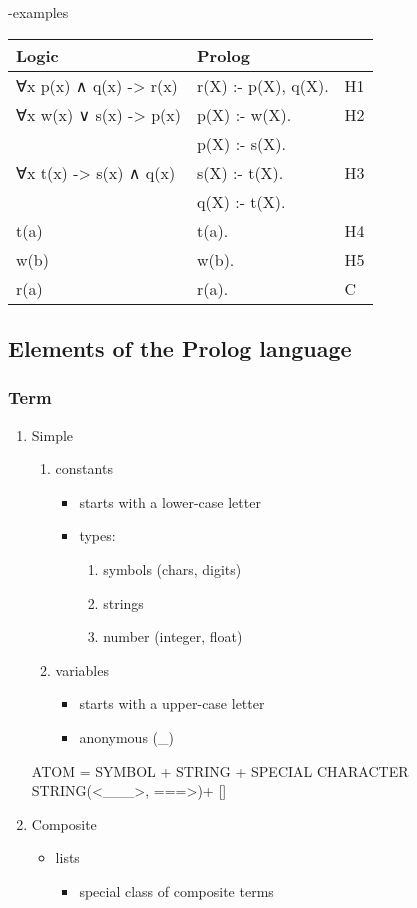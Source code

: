 \documentclass[11pt]{article}
\begin{document}
-examples
\begin{center}
\begin{tabular}{lll}
\hline
Logic & Prolog & \\
\hline
∀x p(x) ∧ q(x) -> r(x) & r(X) :- p(X), q(X). & H1\\
\hline
∀x w(x) ∨ s(x) -> p(x) & p(X) :- w(X). & H2\\
 & p(X) :- s(X). & \\
\hline
∀x t(x) -> s(x) ∧ q(x) & s(X) :- t(X). & H3\\
 & q(X) :- t(X). & \\
\hline
t(a) & t(a). & H4\\
\hline
w(b) & w(b). & H5\\
\hline
r(a) & r(a). & C\\
\hline
\end{tabular}
\end{center}
\subsection{Elements of the Prolog language}
\label{sec:orge9f406e}
\subsubsection{Term}
\label{sec:orgf442dac}
\begin{enumerate}
\item Simple
\label{sec:org7a92bbd}
\begin{enumerate}
\item constants
\begin{itemize}
\item starts with a lower-case letter
\item types:
\begin{enumerate}
\item symbols (chars, digits)
\item strings
\item number (integer, float)
\end{enumerate}
\end{itemize}
\item variables
\begin{itemize}
\item starts with a upper-case letter
\item anonymous (\_)
\end{itemize}
\end{enumerate}
ATOM = SYMBOL + STRING + SPECIAL CHARACTER STRING(<\_\_\_>, ===>)+ []
\item Composite
\label{sec:orgd8d57d9}
\begin{itemize}
\item lists
\begin{itemize}
\item special class of composite terms
\end{itemize}
\end{itemize}
\end{enumerate}
\end{document}
